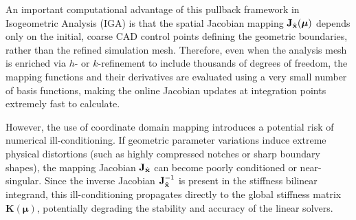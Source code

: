 \begin{table}[htbp]
    \centering
    \caption{Algebraic and computational comparison between Naive and Pullback discretization.}
    \label{tab:naive_vs_pullback_algebraic}
\end{table}

\begin{tcolorbox}[colback=lightbg, colframe=accentcyan, title=\textbf{Remark: Computational Efficiency \& Conditioning of Jacobian Mapping}, fonttitle=\bfseries]
    An important computational advantage of this pullback framework in Isogeometric Analysis (IGA) is that the spatial Jacobian mapping $\mathbf{J}_{\hat{\mathbf{x}}}(\boldsymbol{\mu})$ depends only on the initial, coarse CAD control points defining the geometric boundaries, rather than the refined simulation mesh. Therefore, even when the analysis mesh is enriched via $h$- or $k$-refinement to include thousands of degrees of freedom, the mapping functions and their derivatives are evaluated using a very small number of basis functions, making the online Jacobian updates at integration points extremely fast to calculate.
    
    However, the use of coordinate domain mapping introduces a potential risk of numerical ill-conditioning. If geometric parameter variations induce extreme physical distortions (such as highly compressed notches or sharp boundary shapes), the mapping Jacobian $\mathbf{J}_{\hat{\mathbf{x}}}$ can become poorly conditioned or near-singular. Since the inverse Jacobian $\mathbf{J}_{\hat{\mathbf{x}}}^{-1}$ is present in the stiffness bilinear integrand, this ill-conditioning propagates directly to the global stiffness matrix $\mathbf{K}(\boldsymbol{\mu})$, potentially degrading the stability and accuracy of the linear solvers.
\end{tcolorbox}

